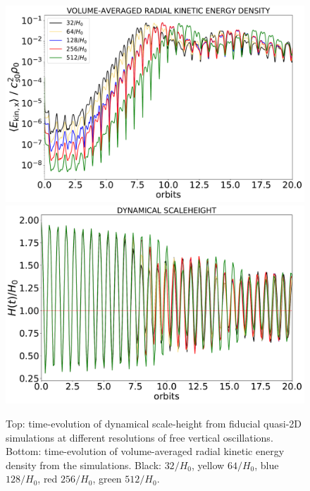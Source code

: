 \documentclass[fleqn,usenatbib]{mnras}
\begin{document}
\begin{figure}
\centering
\includegraphics[scale=0.23]{Figures/figure00PRODUCTION_testrun_VSTRHYDRO2DRes32Re4687H6BouncezBCReflectiveLx8HComparison_timeevolution_volavg_kineticenergydensity_xcomp.pdf}
\includegraphics[scale=0.23]{Figures/figure00PRODUCTION_testrun_VSTRHYDRO2DRes32Re4687H6BouncezBCReflectiveLx8HComparison_timeevolution_dynamicalH.pdf}
\caption{Top: time-evolution of dynamical scale-height from fiducial quasi-2D simulations at different resolutions of free vertical oscillations. Bottom: time-evolution of volume-averaged radial kinetic energy density from the simulations. Black: $32/H_0$, yellow $64/H_0$, blue $128/H_0$, red $256/H_0$, green $512/H_0$.}
\label{FIGURE_Quasi2DSimsTimeEvolutionDynamicalHAndEkinx}
\end{figure}
\end{document}
